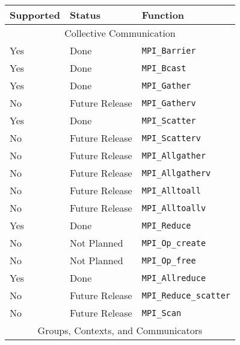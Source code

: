 \documentclass{report}
\begin{document}
\begin{tabular}{|l|l|l|}
\hline
\bf{Supported} & \bf{Status}       & \bf{Function} \\ \hline

\hline
\multicolumn{3}{|c|}{ Collective Communication } \\ \hline 

Yes            & Done               & \verb|MPI_Barrier| \\ \hline
Yes            & Done               & \verb|MPI_Bcast| \\ \hline
Yes            & Done               & \verb|MPI_Gather| \\ \hline
No             & Future Release     & \verb|MPI_Gatherv| \\ \hline
Yes            & Done               & \verb|MPI_Scatter| \\ \hline
No             & Future Release     & \verb|MPI_Scatterv| \\ \hline
No             & Future Release     & \verb|MPI_Allgather| \\ \hline
No             & Future Release     & \verb|MPI_Allgatherv| \\ \hline
No             & Future Release     & \verb|MPI_Alltoall| \\ \hline
No             & Future Release     & \verb|MPI_Alltoallv| \\ \hline
Yes            & Done               & \verb|MPI_Reduce| \\ \hline
No             & Not Planned        & \verb|MPI_Op_create| \\ \hline
No             & Not Planned        & \verb|MPI_Op_free| \\ \hline
Yes            & Done               & \verb|MPI_Allreduce| \\ \hline
No             & Future Release     & \verb|MPI_Reduce_scatter| \\ \hline
No             & Future Release     & \verb|MPI_Scan| \\ \hline


\hline
\multicolumn{3}{|c|}{ Groups, Contexts, and Communicators } \\ \hline


\end{tabular}
\end{document}
